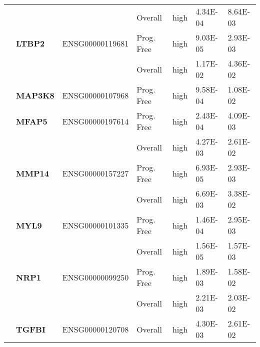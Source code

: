 {\begin{longtable}{|>{\bfseries}p{3cm}|>{\bfseries}p{1.9cm}|p{3cm}|p{2cm}|p{2cm}|p{1.5cm}|p{1.5cm}|}
        \hhline{~~~----}
                                                                &          &                 & Overall    & high & 4.34E-04 & 8.64E-03 \\
        \hhline{~------}
                                                                & LTBP2    & ENSG00000119681 & Prog. Free & high & 9.03E-05 & 2.93E-03 \\
        \hhline{~~~----}
                                                                &          &                 & Overall    & high & 1.17E-02 & 4.36E-02 \\
        \hhline{~------}
                                                                & MAP3K8   & ENSG00000107968 & Prog. Free & high & 9.58E-04 & 1.08E-02 \\
        \hhline{~------}
                                                                & MFAP5    & ENSG00000197614 & Prog. Free & high & 2.43E-04 & 4.09E-03 \\
        \hhline{~~~----}
                                                                &          &                 & Overall    & high & 4.27E-03 & 2.61E-02 \\
        \hhline{~------}
                                                                & MMP14    & ENSG00000157227 & Prog. Free & high & 6.93E-05 & 2.93E-03 \\
        \hhline{~~~----}
                                                                &          &                 & Overall    & high & 6.69E-03 & 3.38E-02 \\
        \hhline{~------}
                                                                & MYL9     & ENSG00000101335 & Prog. Free & high & 1.46E-04 & 2.95E-03 \\
        \hhline{~~~----}
                                                                &          &                 & Overall    & high & 1.56E-05 & 1.57E-03 \\
        \hhline{~------}
                                                                & NRP1     & ENSG00000099250 & Prog. Free & high & 1.89E-03 & 1.58E-02 \\
        \hhline{~~~----}
                                                                &          &                 & Overall    & high & 2.21E-03 & 2.03E-02 \\
        \hhline{~------}
                                                                & TGFBI    & ENSG00000120708 & Overall    & high & 4.30E-03 & 2.61E-02 \\

\end{longtable}}
